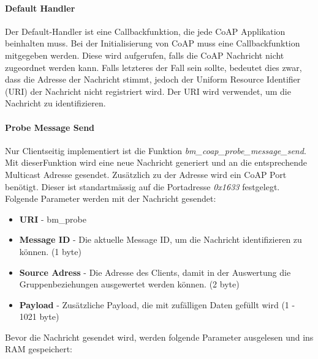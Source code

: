 \paragraph{Default Handler} 
Der Default-Handler ist eine Callbackfunktion, die jede CoAP Applikation beinhalten muss. Bei der Initialisierung von CoAP muss eine Callbackfunktion mitgegeben werden. Diese wird aufgerufen, falls die CoAP Nachricht nicht zugeordnet werden kann. Falls letzteres der Fall sein sollte, bedeutet dies zwar, dass die Adresse der Nachricht stimmt, jedoch der Uniform Resource Identifier (URI) der Nachricht nicht registriert wird. Der URI wird verwendet, um die Nachricht zu identifizieren. 

\paragraph{Probe Message Send}
Nur Clientseitig implementiert ist die Funktion \textit{bm\_coap\_probe\_message\_send}. Mit dieser\linebreak Funktion wird eine neue Nachricht generiert und an die entsprechende Multicast Adresse gesendet. Zusätzlich zu der Adresse wird ein CoAP Port benötigt. Dieser ist standartmässig auf die Portadresse \textit{0x1633} festgelegt. Folgende Parameter werden mit der Nachricht gesendet:

\begin{itemize}
	\item \textbf{URI} - bm\_probe
	\item \textbf{Message ID} - Die aktuelle Message ID, um die Nachricht identifizieren zu können. (1 byte)
	\item \textbf{Source Adress} - Die Adresse des Clients, damit in der Auswertung die Gruppenbeziehungen ausgewertet werden können. (2 byte)
	\item \textbf{Payload} - Zusätzliche Payload, die mit zufälligen Daten gefüllt wird (1 - 1021 byte)
\end{itemize}

Bevor die Nachricht gesendet wird, werden folgende Parameter ausgelesen und ins RAM gespeichert:

